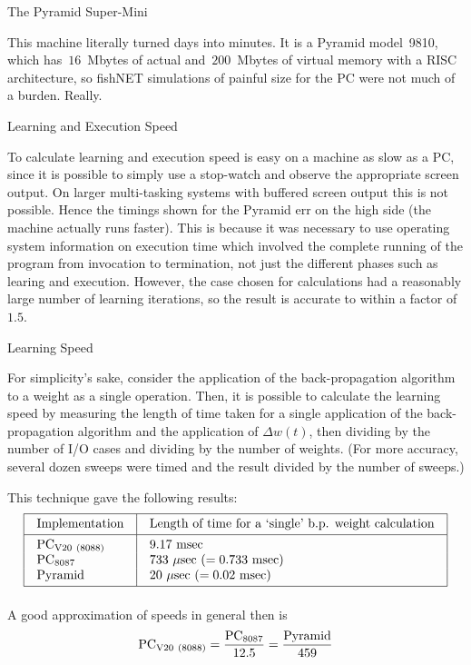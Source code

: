 \ssec The Pyramid Super-Mini

This machine literally turned days into minutes.
It is a Pyramid model~9810, which has~$16$~Mbytes of 
actual and~$200$~Mbytes of virtual
memory with a RISC architecture, so fishNET simulations 
of painful size for the PC were not much of a burden. 
Really.

\sec Learning and Execution Speed

To calculate learning and execution speed is easy on a machine as
slow as a PC, since it is possible to simply use a stop-watch and
observe the appropriate screen output.
On larger multi-tasking systems with buffered screen output this is
not possible.
Hence the timings shown for the Pyramid err on the high side
(the machine actually runs faster).
This is because it was necessary to use operating system information
on execution time which involved the complete running of the
program from invocation to termination, not just the different
phases such as learing and execution.
However, the case chosen for calculations had a reasonably large
number of learning iterations, so the result is accurate to within a
factor of~$1.5$.

\ssec Learning Speed

For simplicity's sake, consider the application of the
back-propagation algorithm to a weight as a single operation.
Then, it is possible to calculate the learning speed by measuring
the length of time taken for a single application of the
back-propagation algorithm and the application of $\Delta w(t)$,
then dividing by the number of I/O cases and dividing by the number
of weights.
(For more accuracy, several dozen sweeps were timed and the result
divided by the number of sweeps.)

This technique gave the following results:
$$
\vbox{\offinterlineskip
\hrule
\halign{&\vrule#&\strut\quad#\hfil\quad\cr
height2pt&\omit&&\omit&\cr
&Implementation&&
	Length of time for a `single' b.p. weight calculation&\cr
height2pt&\omit&&\omit&\cr
\noalign{\hrule}
height2pt&\omit&&\omit&\cr
&PC$_{\rm V20\ (8088)}$&&$9.17$\ msec&\cr
&PC$_{\rm 8087}$&&$733$\ $\mu$sec\ $(=0.733{\rm \ msec})$&\cr
&Pyramid&&$20$\ $\mu$sec\ $(=0.02{\rm \ msec})$&\cr
height2pt&\omit&&\omit&\cr}
\hrule}
$$

A good approximation of speeds in general then is
$$
{\rm PC}_{\rm V20\ (8088)} = {{\rm PC}_{\rm 8087} \over 12.5} 
			= {{\rm Pyramid} \over 459}
$$

